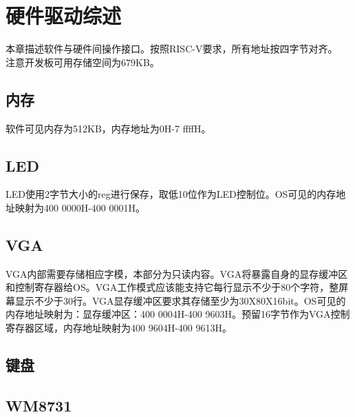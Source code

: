 %
% 
% 
% 
% 
% 
% 
%

\chapter{硬件驱动综述}
本章描述软件与硬件间操作接口。按照RISC-V要求，所有地址按四字节对齐。\\
注意开发板可用存储空间为679KB。
\section{内存}
软件可见内存为512KB，内存地址为0H-7 ffffH。
\section{LED}
LED使用2字节大小的reg进行保存，取低10位作为LED控制位。OS可见的内存地址映射为400 0000H-400 0001H。
\section{VGA}
VGA内部需要存储相应字模，本部分为只读内容。VGA将暴露自身的显存缓冲区和控制寄存器给OS。VGA工作模式应该能支持它每行显示不少于80个字符，整屏幕显示不少于30行。VGA显存缓冲区要求其存储至少为30X80X16bit。OS可见的内存地址映射为：显存缓冲区：400 0004H-400 9603H。预留16字节作为VGA控制寄存器区域，内存地址映射为400 9604H-400 9613H。
\section{键盘}
\section{WM8731}
